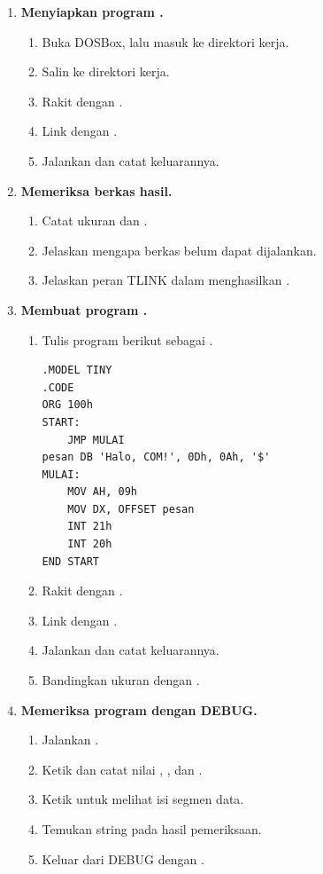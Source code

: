 \begin{enumerate}
    \item \textbf{Menyiapkan program .}
    \begin{enumerate}
        \item Buka DOSBox, lalu masuk ke direktori kerja.
        \item Salin  ke direktori kerja.
        \item Rakit dengan .
        \item Link dengan .
        \item Jalankan  dan catat keluarannya.
    \end{enumerate}

    \item \textbf{Memeriksa berkas hasil.}
    \begin{enumerate}
        \item Catat ukuran  dan .
        \item Jelaskan mengapa berkas  belum dapat
              dijalankan.
        \item Jelaskan peran TLINK dalam menghasilkan
              .
    \end{enumerate}

    \item \textbf{Membuat program .}
    \begin{enumerate}
        \item Tulis program berikut sebagai .

\begin{lstlisting}[language=MASM, numbers=none]
.MODEL TINY
.CODE
ORG 100h
START:
    JMP MULAI
pesan DB 'Halo, COM!', 0Dh, 0Ah, '$'
MULAI:
    MOV AH, 09h
    MOV DX, OFFSET pesan
    INT 21h
    INT 20h
END START
\end{lstlisting}

        \item Rakit dengan .
        \item Link dengan .
        \item Jalankan  dan catat keluarannya.
        \item Bandingkan ukuran  dengan .
    \end{enumerate}

    \item \textbf{Memeriksa program dengan DEBUG.}
    \begin{enumerate}
        \item Jalankan .
        \item Ketik  dan catat nilai , ,
              dan .
        \item Ketik  untuk melihat isi segmen
              data.
        \item Temukan string  pada hasil
              pemeriksaan.
        \item Keluar dari DEBUG dengan .
    \end{enumerate}


\end{enumerate}
